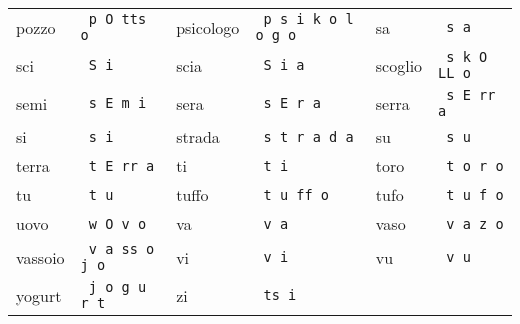 \begin{tabular}{ll|ll|ll}
pozzo & \texttt{ p O tts o} & psicologo & \texttt{ p s i k o l o g o} & sa & \texttt{ s a} \\
sci & \texttt{ S i} & scia & \texttt{ S i a} & scoglio & \texttt{ s k O LL o} \\
semi & \texttt{ s E m i} & sera & \texttt{ s E r a} & serra & \texttt{ s E rr a} \\
si & \texttt{ s i} & strada & \texttt{ s t r a d a} & su & \texttt{ s u} \\
terra & \texttt{ t E rr a} & ti & \texttt{ t i} & toro & \texttt{ t o r o} \\
tu & \texttt{ t u} & tuffo & \texttt{ t u ff o} & tufo & \texttt{ t u f o} \\
uovo & \texttt{ w O v o} & va & \texttt{ v a} & vaso & \texttt{ v a z o} \\
vassoio & \texttt{ v a ss o j o} & vi & \texttt{ v i} & vu & \texttt{ v u} \\
yogurt & \texttt{ j o g u r t} & zi & \texttt{ ts i} &  & \\\hline\hline\end{tabular}
